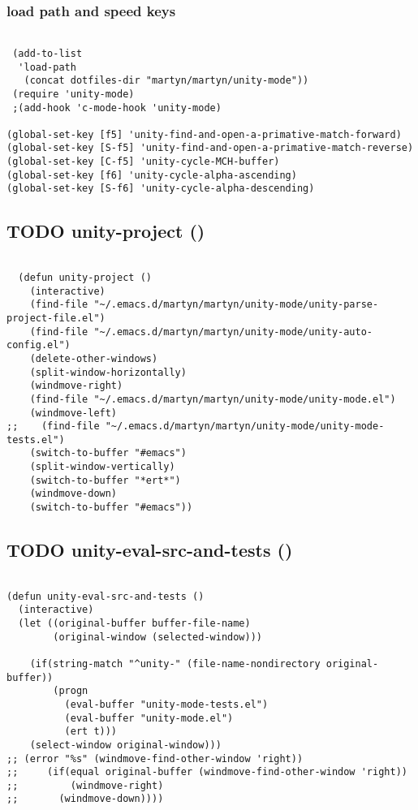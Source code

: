 \documentclass[colorlinks=true,urlcolor=blue,listings-sv]{article}
\begin{document}
\subsubsection{load path and speed keys}
\label{sec-2-22-1}



\lstset{language=Lisp}
\begin{lstlisting}

 (add-to-list 
  'load-path
   (concat dotfiles-dir "martyn/martyn/unity-mode"))
 (require 'unity-mode)
 ;(add-hook 'c-mode-hook 'unity-mode)

(global-set-key [f5] 'unity-find-and-open-a-primative-match-forward)
(global-set-key [S-f5] 'unity-find-and-open-a-primative-match-reverse)
(global-set-key [C-f5] 'unity-cycle-MCH-buffer)
(global-set-key [f6] 'unity-cycle-alpha-ascending)
(global-set-key [S-f6] 'unity-cycle-alpha-descending)
\end{lstlisting}
\subsection{\textbf{TODO} unity-project ()}
\label{sec-2-23}



\lstset{language=Lisp}
\begin{lstlisting}

  (defun unity-project ()
    (interactive)
    (find-file "~/.emacs.d/martyn/martyn/unity-mode/unity-parse-project-file.el")
    (find-file "~/.emacs.d/martyn/martyn/unity-mode/unity-auto-config.el")
    (delete-other-windows)
    (split-window-horizontally)
    (windmove-right)
    (find-file "~/.emacs.d/martyn/martyn/unity-mode/unity-mode.el")
    (windmove-left)
;;    (find-file "~/.emacs.d/martyn/martyn/unity-mode/unity-mode-tests.el")
    (switch-to-buffer "#emacs")
    (split-window-vertically)
    (switch-to-buffer "*ert*")
    (windmove-down)
    (switch-to-buffer "#emacs"))
\end{lstlisting}
\subsection{\textbf{TODO} unity-eval-src-and-tests ()}
\label{sec-2-24}



\lstset{language=Lisp}
\begin{lstlisting}

(defun unity-eval-src-and-tests ()
  (interactive)
  (let ((original-buffer buffer-file-name)
        (original-window (selected-window)))

    (if(string-match "^unity-" (file-name-nondirectory original-buffer)) 
        (progn
          (eval-buffer "unity-mode-tests.el")
          (eval-buffer "unity-mode.el")
          (ert t)))
    (select-window original-window))) 
;; (error "%s" (windmove-find-other-window 'right))
;;     (if(equal original-buffer (windmove-find-other-window 'right))
;;         (windmove-right)
;;       (windmove-down))))
\end{lstlisting}
\end{document}
